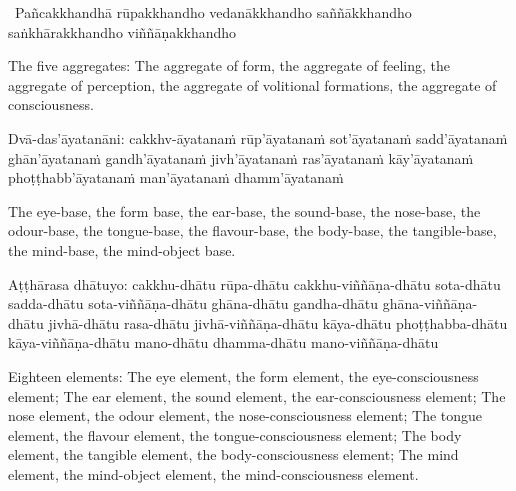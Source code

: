 \vspace{-0.8em}

\begin{pali-hang}
\anglebracketleft\ \hspace{-0.5mm}Pañcakkhandhā \hspace{-0.5mm}\anglebracketright\: rūpakkhandho vedanākkhandho saññākkhandho saṅkhārakkhandho viññāṇakkhandho
\end{pali-hang}

\begin{english-verses}
  The five aggregates: The aggregate of form, the aggregate of feeling, the aggregate of perception, the aggregate of volitional formations, the aggregate of consciousness.
\end{english-verses}

\suttaRef{[MN 109]}

\begin{pali-hang-continued}
Dvā-das'āyatanāni: cakkhv-āyatanaṁ rūp'āyatanaṁ sot'āyatanaṁ sadd'āyatanaṁ ghān'āyatanaṁ gandh'āyatanaṁ jivh'āyatanaṁ ras'āyatanaṁ kāy'āyatanaṁ phoṭṭhabb'āyatanaṁ man'āyatanaṁ dhamm'āyatanaṁ
\end{pali-hang-continued}

\begin{english-verses}
  The eye-base, the form base, the ear-base, the sound-base, the nose-base, the odour-base, the tongue-base, the flavour-base, the body-base, the tangible-base, the mind-base, the mind-object base.
\end{english-verses}

\suttaRef{[MN 148]}

\begin{pali-hang-continued}
Aṭṭhārasa dhātuyo: cakkhu-dhātu rūpa-dhātu cakkhu-viññāṇa-dhātu sota-dhātu sadda-dhātu sota-viññāṇa-dhātu ghāna-dhātu gandha-dhātu ghāna-viññāṇa-dhātu jivhā-dhātu rasa-dhātu jivhā-viññāṇa-dhātu kāya-dhātu phoṭṭhabba-dhātu kāya-viññāṇa-dhātu mano-dhātu dhamma-dhātu mano-viññāṇa-dhātu
\end{pali-hang-continued}

\begin{english-verses}
  Eighteen elements: The eye element, the form element, the eye-consciousness element; The ear element, the sound element, the ear-consciousness element; The nose element, the odour element, the nose-consciousness element; The tongue element, the flavour element, the tongue-consciousness element; The body element, the tangible element, the body-consciousness element; The mind element, the mind-object element, the mind-consciousness element.
\end{english-verses}

